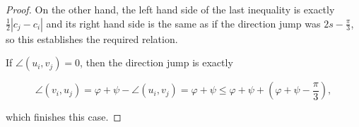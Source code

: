 \begin{enumerate}[label={\bf Case \arabic*: }, wide, labelwidth=!, labelindent=0pt]
\begin{proof}
On the other hand, the left hand side of the last inequality is exactly $\frac12|c_j - c_i|$ and its right hand side is the same as if the direction jump was $2s - \frac{\pi}{3}$, so this establishes the required relation.

If $\angle(u_i, v_j) = 0$, then the direction jump is exactly

$$\angle(v_i, u_j) = \varphi + \psi - \angle(u_i, v_j) = \varphi + \psi \leq \varphi + \psi + \left(\varphi + \psi - \frac{\pi}{3}\right),$$

which finishes this case.
\end{proof}







\end{enumerate}
